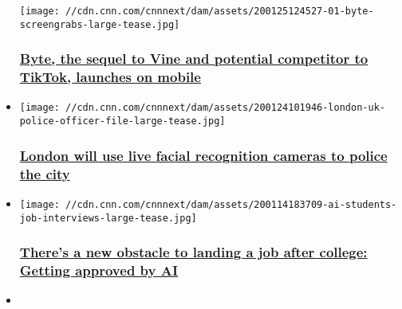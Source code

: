 \begin{itemize}
  \texttt{[image: //cdn.cnn.com/cnnnext/dam/assets/200125124527-01-byte-screengrabs-large-tease.jpg]}

  \hypertarget{byte-the-sequel-to-vine-and-potential-competitor-to-tiktok-launches-on-mobile}{%
  \subsubsection{\texorpdfstring{\href{/2020/01/25/tech/byte-app-tiktok-vine/index.html}{Byte,
  the sequel to Vine and potential competitor to TikTok, launches on
  mobile}}{Byte, the sequel to Vine and potential competitor to TikTok, launches on mobile}}\label{byte-the-sequel-to-vine-and-potential-competitor-to-tiktok-launches-on-mobile}}
\item
  \href{/2020/01/24/tech/london-live-facial-recognition/index.html}{}

  \texttt{[image: //cdn.cnn.com/cnnnext/dam/assets/200124101946-london-uk-police-officer-file-large-tease.jpg]}

  \hypertarget{london-will-use-live-facial-recognition-cameras-to-police-the-city}{%
  \subsubsection{\texorpdfstring{\href{/2020/01/24/tech/london-live-facial-recognition/index.html}{London
  will use live facial recognition cameras to police the
  city}}{London will use live facial recognition cameras to police the city}}\label{london-will-use-live-facial-recognition-cameras-to-police-the-city}}
\item
  \href{/2020/01/15/tech/ai-job-interview/index.html}{}

  \texttt{[image: //cdn.cnn.com/cnnnext/dam/assets/200114183709-ai-students-job-interviews-large-tease.jpg]}

  \hypertarget{theres-a-new-obstacle-to-landing-a-job-after-college-getting-approved-by-ai}{%
  \subsubsection{\texorpdfstring{\href{/2020/01/15/tech/ai-job-interview/index.html}{There's
  a new obstacle to landing a job after college: Getting approved by
  AI}}{There's a new obstacle to landing a job after college: Getting approved by AI}}\label{theres-a-new-obstacle-to-landing-a-job-after-college-getting-approved-by-ai}}
\item
  \href{/2020/01/07/tech/samsung-ballie-ces-2020/index.html}{}


\end{itemize}
